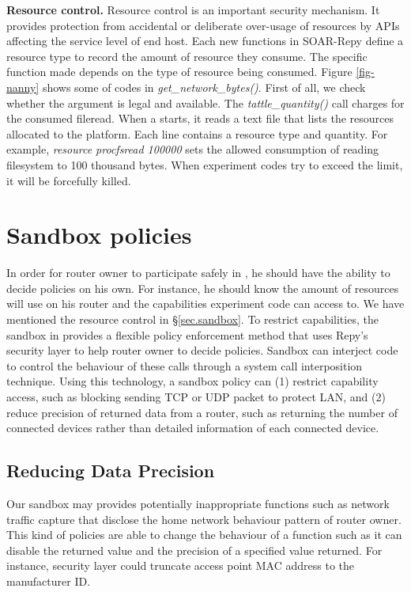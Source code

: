 \textbf{Resource control.} Resource control is an important security mechanism. It provides protection from accidental or deliberate over-usage of resources by APIs affecting the service level of end host. Each new functions in SOAR-Repy define a resource type to record the amount of resource they consume. The specific function made depends on the type of resource being consumed. Figure \ref{fig-nanny} shows some of codes in \textit{get\_network\_bytes()}. First of all, we check whether the argument is legal and available. The \textit{tattle\_quantity()} call charges for the consumed fileread. When a \sysname starts, it reads a text file that lists the resources allocated to the platform. Each line contains a resource type and quantity. For example, \textit{resource procfsread 100000} sets the allowed consumption of reading \text{\\proc} filesystem to 100 thousand bytes. When experiment codes try to exceed the limit, it will be forcefully killed.

\section{Sandbox policies}
\label{sec.policy}
In order for router owner to participate safely in \sysname, he should have the ability to decide policies on his own. For instance, he should know the amount of resources \sysname will use on his router and the capabilities experiment code can access to. We have mentioned the resource control in \S{\ref{sec.sandbox}}. To restrict capabilities, the sandbox in \sysname provides a flexible policy enforcement method that uses Repy's security layer to help router owner to decide policies. Sandbox can interject code to control the behaviour of these calls through a system call interposition technique. Using this technology, a sandbox policy can (1) restrict capability access, such as blocking sending TCP or UDP packet to protect LAN, and (2) reduce precision of returned data from a router, such as returning the number of connected devices rather than detailed information of each connected device.

\subsection{Reducing Data Precision}
Our sandbox may provides potentially inappropriate functions such as network traffic capture that disclose the home network behaviour pattern of router owner. This kind of policies are able to change the behaviour of a function such as it can disable the returned value and the precision of a specified value returned. For instance, security layer could truncate access point MAC address to the manufacturer ID.

